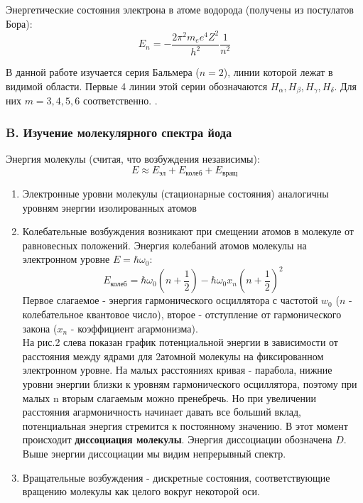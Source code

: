 \documentclass[a4paper,12pt]{article} %
\begin{document}
Энергетические состояния электрона в атоме водорода (получены из постулатов Бора):
\begin{equation}
    E_n = -\frac{2\pi^2m_e e^4 Z^2 }{h^2}\frac{1}{n^2}
\end{equation}

В данной работе изучается серия Бальмера ($n = 2$), линии которой лежат в видимой области. Первые 4 линии этой серии обозначаются $H_\alpha, H_\beta, H_\gamma, H_\delta$. Для них $m = 3, 4, 5, 6$ соответственно. .

\subsubsection*{B. Изучение молекулярного спектра йода}
Энергия молекулы (считая, что возбуждения независимы):
\begin{equation*}
    E \approx E_{\text{эл}} + E_{\text{колеб}} + E_{\text{вращ}}
\end{equation*}
\begin{enumerate}
    \item Электронные уровни молекулы (стационарные состояния) аналогичны уровням энергии изолированных атомов
    
    \item Колебательные возбуждения возникают при смещении атомов в молекуле от равновесных положений. Энергия колебаний атомов молекулы на электронном уровне $E = \hbar \omega_0$: 
    \begin{equation*}
        E_{\text{колеб}} = \hbar \omega_0 (n + \frac{1}{2}) - \hbar \omega_0 x_n (n + \frac{1}{2})^2
    \end{equation*}
    Первое слагаемое - энергия гармонического осциллятора с частотой $w_0$ ($n$ - колебательное квантовое число), второе - отступление от гармонического закона ($x_n$ - коэффициент агармонизма).\\ На рис.2 слева показан график потенциальной энергии в зависимости от расстояния между ядрами для 2атомной молекулы на фиксированном электронном уровне. На малых расстояниях кривая - парабола, нижние уровни энергии близки к уровням гармонического осциллятора, поэтому при малых n вторым слагаемым можно пренебречь. Но при увеличении расстояния агармоничность начинает давать все больший вклад, потенциальная энергия стремится к постоянному значению. В этот момент происходит \textbf{диссоциация молекулы}. Энергия диссоциации обозначена $D$. Выше энергии диссоциации мы видим непрерывный спектр. 
    
    \item Вращательные возбуждения - дискретные состояния, соответствующие вращению молекулы как целого вокруг некоторой оси. 
\end{enumerate}
\end{document}
